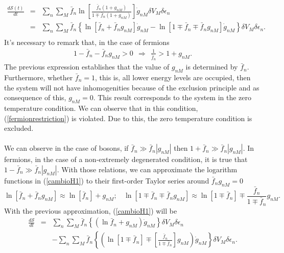 \documentclass{article}
\newcommand{\de}{\delta}
\newcommand{\Ss}{\mathcal{S}}
\begin{document}
\begin{eqnarray}
    \frac{d\Ss (t)}{dt}&=&\sum_n \sum_M \bar{f}_{n}\ln \left[ \frac{\bar{f}_{n}(1+g_{nM})}{1\mp \bar{f}_{n} (1+ g_{nM})} \right]\dot{g}_{nM} \de V_M\delta \epsilon_n \nonumber \\
    &=&\sum_n \sum_M \bar{f}_n \left \{ \ln [\bar{f}_n+\bar{f}_n g_{nM}]\dot{g}_{nM}-\ln [1\mp\bar{f}_n\mp\bar{f}_n g_{nM}]\dot{g}_{nM}  \right \}\de V_M \delta \epsilon_n.\nonumber \\
    \label{cambioH1}
\end{eqnarray}{}
It's necessary to remark that, in the case of fermions
\begin{eqnarray}
   1-\bar f_n -\bar f_n g_{nM}>0 \ \ \Rightarrow \ \ \frac{1}{\bar f_n}>1+g_{nM}. \label{fermionrestriction}
\end{eqnarray}{}
The previous expression establishes that the value of $g_{nM}$ is determined by $\bar f_n$. Furthermore, whether $\bar f_{n}=1$, this is, all lower energy levels are occupied, then the system will not have inhomogenities because of the exclusion principle and as consequence of this,  $g_{nM}=0$. This result corresponds to the system in the zero temperature condition. We can observe that in this condition, (\ref{fermionrestriction}) is violated. Due to this, the zero temperature condition is excluded.\\
\\
We can observe in the case of bosons, if $\bar{f}_n \gg \bar{f}_n |g_{nM}|$ then $1+\bar{f}_n \gg \bar{f}_n |g_{nM}|$. In fermions, in the case of a non-extremely degenerated condition, it is true that $1-\bar{f}_n \gg \bar{f}_n |g_{nM}|$. With those relations, we can approximate the logarithm functions in (\ref{cambioH1}) to their first-order Taylor series around $\bar f_n g_{nM}=0$ 
\begin{equation}
    \ln [\bar{f}_n+\bar{f}_n g_{nM}] \approx \ln [\bar{f}_n]+ g_{nM}; \ \ \ \ \ln[1\mp\bar{f}_n\mp\bar{f}_n g_{nM}] \approx \ln[1\mp\bar{f}_n]\mp\frac{\bar{f}_n}{1\mp\bar{f}_{n}} g_{nM}. \label{lnapproximation}
\end{equation}{}
With the previous approximation, (\ref{cambioH1}) will be
\begin{eqnarray}
    \frac{d\Ss}{dt}&=&\sum_n \sum_M \bar{f}_n\left \{ (\ln \bar{f}_n+ g_{nM})\dot{g}_{nM}\right\} \de V_M \delta \epsilon_n \nonumber \\
    &&-\sum_{n}\sum_{M}\bar f_n\left\{ \left( \ln[1\mp\bar{f}_n]\mp \left[\frac{\bar{f}_n}{1\mp\bar{f}_n} \right] g_{nM}\right)\dot{g}_{nM} \right \}\de V_M \delta \epsilon_n.\label{cambioH2}
\end{eqnarray}{}
\end{document}

